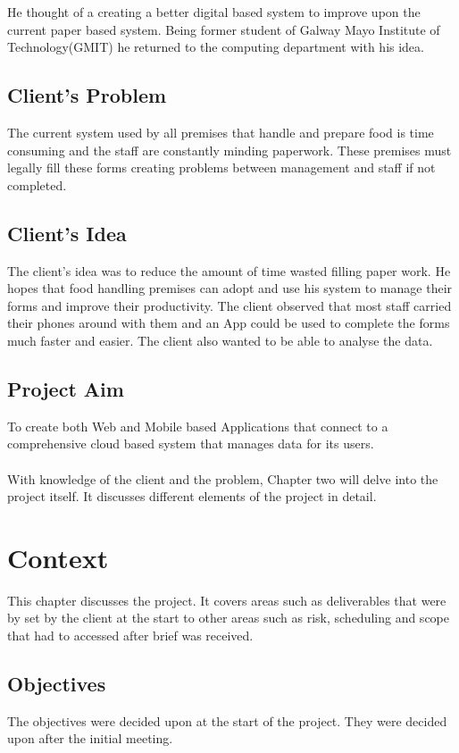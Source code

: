 He thought of a creating a better digital based system to improve upon the current paper based system. Being former student of Galway Mayo Institute of Technology(GMIT) he returned to the computing department with his idea.

\section{Client’s Problem}
The current system used by all premises that handle and prepare food is time consuming and the staff are constantly minding paperwork. These premises must legally fill these forms creating problems between management and staff if not completed.

\section{Client’s Idea}
The client’s idea was to reduce the amount of time wasted filling paper work. He hopes that food handling premises can adopt and use his system to manage their forms and improve their productivity. The client observed that most staff carried their phones around with them and an App could be used to complete the forms much faster and easier. The client also wanted to be able to analyse the data.

\section{Project Aim}
To create both Web and Mobile based Applications that connect to a comprehensive cloud based system that manages data for its users.\\ \\
With knowledge of the client and the problem, Chapter two will delve into the project itself. It discusses different elements of the project in detail.


\chapter{Context}
This chapter discusses the project. It covers areas such as deliverables that were by set by the client at the start to other areas such as risk, scheduling and scope that had to accessed after brief was received.

\section{Objectives}
The objectives were decided upon at the start of the project. They were decided upon after the initial meeting.\\

